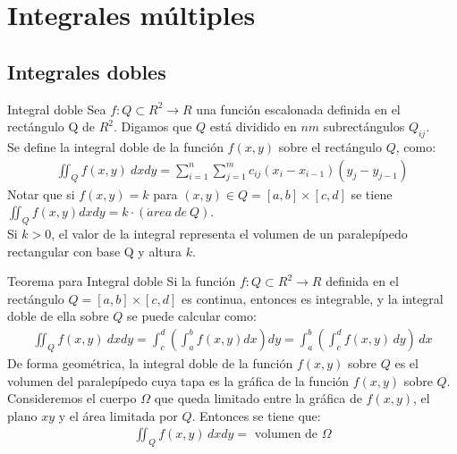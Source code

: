 \documentclass[a4paper, twoside]{article}
\numberwithin{equation}{section}
\numberwithin{figure}{section}
\numberwithin{table}{section}
\begin{document}
\newpage
\section{Integrales múltiples}
\subsection{Integrales dobles}
\begin{definicion*}{Integral doble}
	Sea $f: Q \subset R^2 \to R$ una función escalonada definida en el rectángulo Q de $R^2$. Digamos que $Q$ está dividido en $nm$ subrectángulos $Q_{ij}$.\\
	
	Se define la integral doble de la función $f(x,y)$ sobre el rectángulo $Q$, como: 
	\begin{align}
		\iint_{Q} f(x,y)\: dxdy=\sum_{i=1}^{n} \sum_{j=1}^{m} c_{ij} (x_i-x_{i-1}) (y_j-y_{j-1})
	\end{align}
	Notar que si $f(x,y)=k$ para $(x,y) \in Q=[a,b] \times [c,d]$ se tiene $\iint_{Q} f(x,y)dxdy=k\cdot(\acute{a}rea\: de\: Q)$.\\
	
	Si $k>0$, el valor de la integral representa el volumen de un paralepípedo rectangular con base Q y altura $k$.
\end{definicion*}

\begin{teorema*}{Teorema para Integral doble}
	Si la función $f: Q \subset R^2 \to R$ definida en el rectángulo $Q=[a,b] \times [c,d]$ es continua, entonces es integrable, y la integral doble de ella sobre $Q$ se puede calcular como:
	\begin{align}
		\iint_{Q} f(x,y)\: dxdy=\int_{c}^{d} \left(\int_{a}^{b} f(x,y)dx\right)dy=\int_{a}^{b}\left(\int_{c}^{d} f(x,y)\, dy\right)\, dx
	\end{align}
	De forma geométrica, la integral doble de la función $f(x,y)$ sobre $Q$ es el volumen del paralepípedo cuya tapa es la gráfica de la función $f(x,y)$ sobre $Q$. Consideremos el cuerpo $\Omega$ que queda limitado entre la gráfica de $f(x,y)$, el plano $xy$ y el área limitada por $Q$. Entonces se tiene que:
	\begin{align}
		\iint_{Q}f(x,y)\, dxdy=\text{ volumen de }\Omega
	\end{align}
\end{teorema*}
\end{document}

